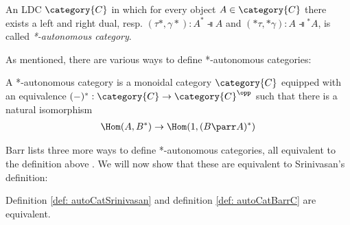 \documentclass[DIN, pagenumber=false, fontsize=11pt, parskip=half, colorinlistoftodos, svgnames]{scrartcl}
\begin{document}
	\begin{definition}
		\label{def: autoCatSrinivasan}
		An LDC $\category{C} $ in which for every object $A \in \category{C} $ there exists a left and right dual, resp. $(\tau*, \gamma*): A^* \dashV A $ and $(*\tau, *\gamma): A \dashV {^*A} $, is called \emph{*-autonomous category}.
	\end{definition}
	
	As mentioned, there are various ways to define *-autonomous categories:
	
	\begin{definition}
		\label{def: autoCatBarrC}
		A *-autonomous category is a monoidal category $\category{C} $ equipped with an equivalence $(-)^* : \category{C} \rightarrow \category{C}^\opp $ such that there is a natural isomorphism 
		\begin{align*}
			\Hom(A, B^*) \rightarrow \Hom(1, (B \parr A)^*)
		\end{align*}
	\end{definition}
	
	Barr lists three more ways to define *-autonomous categories, all equivalent to the definition above \cite{barr95}. We will now show that these are equivalent to Srinivasan's definition:
	
	\begin{theorem}
		Definition \ref{def: autoCatSrinivasan} and definition \ref{def: autoCatBarrC} are equivalent.
	\end{theorem}
	
\end{document}
